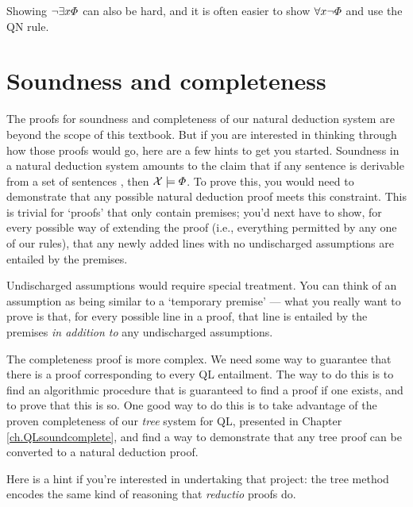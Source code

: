 Showing $\neg \exists x\varPhi{}$ can also be hard, and it is often easier to show  $\forall x\neg \varPhi{}$ and use the QN rule.



\section{Soundness and completeness}

The proofs for soundness and completeness of our natural deduction system are beyond the scope of this textbook. But if you are interested in thinking through how those proofs would go, here are a few hints to get you started. Soundness in a natural deduction system amounts to the claim that if any sentence \metaA{} is derivable from a set of sentences \metaSetX{}, then $\mathcal{X}{}\models\varPhi{}$. To prove this, you would need to demonstrate that any possible natural deduction proof meets this constraint. This is trivial for `proofs' that only contain premises; you'd next have to show, for every possible way of extending the proof (i.e., everything permitted by any one of our rules), that any newly added lines with no undischarged assumptions are entailed by the premises.

Undischarged assumptions would require special treatment. You can think of an assumption as being similar to a `temporary premise' --- what you really want to prove is that, for every possible line in a proof, that line is entailed by the premises \emph{in addition to} any undischarged assumptions.

The completeness proof is more complex. We need some way to guarantee that there is a proof corresponding to every QL entailment. The way to do this is to find an algorithmic procedure that is guaranteed to find a proof if one exists, and to prove that this is so. One good way to do this is to take advantage of the proven completeness of our \emph{tree} system for QL, presented in Chapter \ref{ch.QLsoundcomplete}, and find a way to demonstrate that any tree proof can be converted to a natural deduction proof.

Here is a hint if you're interested in undertaking that project: the tree method encodes the same kind of reasoning that \emph{reductio} proofs do.

\practiceproblems

